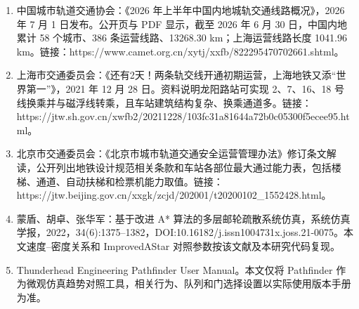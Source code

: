 \documentclass[UTF8,a4paper,12pt]{ctexart}
\begin{document}
\begin{enumerate}
    \item 中国城市轨道交通协会：《2026 年上半年中国内地城轨交通线路概况》，2026 年 7 月 1 日发布。公开页与 PDF 显示，截至 2026 年 6 月 30 日，中国内地累计 58 个城市、386 条运营线路、13268.30 km；上海运营线路长度 1041.96 km。链接：https://www.camet.org.cn/xytj/xxfb/822295470702661.shtml。
    \item 上海市交通委员会：《还有2天！两条轨交线开通初期运营，上海地铁又添“世界第一”》，2021 年 12 月 28 日。资料说明龙阳路站可实现 2、7、16、18 号线换乘并与磁浮线转乘，且车站建筑结构复杂、换乘通道多。链接：https://jtw.sh.gov.cn/xwfb2/20211228/103fc31a81644a72b0c05300f5ecee95.html。
    \item 北京市交通委员会：《北京市城市轨道交通安全运营管理办法》修订条文解读，公开列出地铁设计规范相关条款和车站各部位最大通过能力表，包括楼梯、通道、自动扶梯和检票机能力取值。链接：https://jtw.beijing.gov.cn/xxgk/zcjd/202001/t20200102_1552428.html。
    \item 蒙盾、胡卓、张华军：基于改进 A* 算法的多层邮轮疏散系统仿真，系统仿真学报，2022，34(6):1375--1382，DOI:10.16182/j.issn1004731x.joss.21-0075。本文速度--密度关系和 ImprovedAStar 对照参数按该文献及本研究代码复现。
    \item Thunderhead Engineering Pathfinder User Manual。本文仅将 Pathfinder 作为微观仿真趋势对照工具，相关行为、队列和门选择设置以实际使用版本手册为准。
\end{enumerate}
\end{document}
